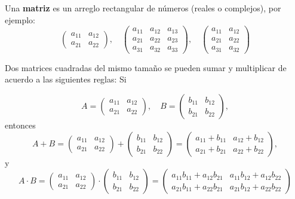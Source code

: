 Una {\bf matriz} es un arreglo rectangular de números (reales o complejos), por ejemplo:
$$
\left(\begin{array}{ccc}
a_{11}&a_{12} \\
a_{21}&a_{22} 
\end{array}\right)
, \quad
\left(\begin{array}{ccc}
a_{11}&a_{12}&a_{13} \\
a_{21}&a_{22}&a_{23} \\
a_{31}&a_{32}&a_{33}  
\end{array}\right),\quad 
\left(\begin{array}{cc}
a_{11}&a_{12} \\
a_{21}&a_{22} \\
a_{31}&a_{32}  
\end{array}\right)
$$

Dos matrices cuadradas del mismo tamaño se pueden sumar y multiplicar de acuerdo a las siguientes reglas: Si

$$A=\left(\begin{array}{cc}
a_{11}&a_{12} \\
a_{21}&a_{22} 
\end{array}\right),\quad 
B=\left(\begin{array}{cc}
b_{11}&b_{12} \\
b_{21}&b_{22} 
\end{array}\right),$$
entonces $$A+B=\left(\begin{array}{cc}
a_{11}&a_{12} \\
a_{21}&a_{22} 
\end{array}\right)
+
\left(\begin{array}{ccc}
b_{11}&b_{12} \\
b_{21}&b_{22}
\end{array}\right)=
\left(\begin{array}{ccc}
a_{11}+b_{11}&a_{12}+b_{12} \\
a_{21}+b_{21}&a_{22}+b_{22}
\end{array}\right),$$
y
$$A\cdot B=\left(\begin{array}{cc}
a_{11}&a_{12} \\
a_{21}&a_{22} 
\end{array}\right)
\cdot
\left(\begin{array}{ccc}
b_{11}&b_{12} \\
b_{21}&b_{22}
\end{array}\right)=
\left(\begin{array}{ccc}
a_{11}b_{11}+a_{12}b_{21}&a_{11}b_{12}+a_{12}b_{22} \\
a_{21}b_{11}+a_{22}b_{21}&a_{21}b_{12}+a_{22}b_{22}
\end{array}\right)$$


